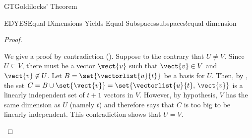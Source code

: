 \begin{subsect}{GT}{Goldilocks' Theorem}
\begin{theorem}{EDYES}{Equal Dimensions Yields Equal Subspaces}{subspaces!equal dimension}
\end{theorem}
%
\begin{proof}
%
\begin{para}We give a proof by contradiction ().  Suppose to the contrary that $U\neq V$.  Since $U\subseteq V$, there must be a vector $\vect{v}$ such that $\vect{v}\in V$ and $\vect{v}\not\in U$.  Let $B=\set{\vectorlist{u}{t}}$ be a basis for $U$.  Then, by , the set $C=B\cup\set{\vect{v}}=\set{\vectorlist{u}{t},\,\vect{v}}$ is a linearly independent set of $t+1$ vectors in $V$.  However, by hypothesis, $V$ has the same dimension as $U$ (namely $t$) and therefore  says that $C$ is too big to be linearly independent.  This contradiction shows that $U=V$.\end{para}
%
\end{proof}
%
\end{subsect}
%
